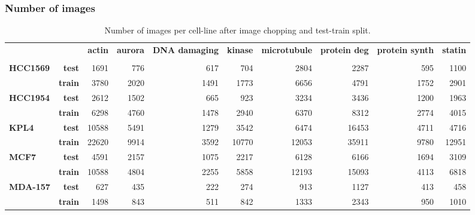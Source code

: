 \documentclass[a4paper,11pt,twoside,openright]{scrbook}
\begin{document}
\subsubsection{Number of images}
\begin{table}[h]
    \scriptsize
    \captionsetup{width=0.8\textwidth}
    \caption[Number of chopped images for MoA prediction]{Number of images per cell-line after image chopping and 
test-train split.}
    \label{table:chopped_image_count}
\begin{tabular}{lrrrrrrrrr}
\toprule
        &  &  \textbf{actin} & \textbf{aurora} & \textbf{DNA damaging} & \textbf{kinase} & \textbf{microtubule} & 
\textbf{protein deg} & \textbf{protein synth} & \textbf{statin} \\
&  &        &        &              &        &             &             &               &        \\
\midrule
\textbf{HCC1569} & \textbf{test} &   1691 &    776 &          617 &    704 &        2804 &        2287 &           595 
&   1100 \\
        & \textbf{train} &   3780 &   2020 &         1491 &   1773 &        6656 &        4791 &          1752 &   2901 
\\
\textbf{HCC1954} & \textbf{test} &   2612 &   1502 &          665 &    923 &        3234 &        3436 &          1200 
&   1963 \\
        & \textbf{train} &   6298 &   4760 &         1478 &   2940 &        6370 &        8312 &          2774 &   4015 
\\
\textbf{KPL4} & \textbf{test} &  10588 &   5491 &         1279 &   3542 &        6474 &       16453 &          4711 &   
4716 \\
        & \textbf{train} &  22620 &   9914 &         3592 &  10770 &       12053 &       35911 &          9780 &  12951 
\\
\textbf{MCF7} & \textbf{test} &   4591 &   2157 &         1075 &   2217 &        6128 &        6166 &          1694 &   
3109 \\
        & \textbf{train} &  10588 &   4804 &         2255 &   5858 &       12193 &       15093 &          4113 &   6818 
\\
\textbf{MDA-157} & \textbf{test} &    627 &    435 &          222 &    274 &         913 &        1127 &           413 
&    458 \\
        & \textbf{train} &   1498 &    843 &          511 &    842 &        1333 &        2343 &           950 &   1010 
\\

\end{tabular}
\end{table}
\end{document}
